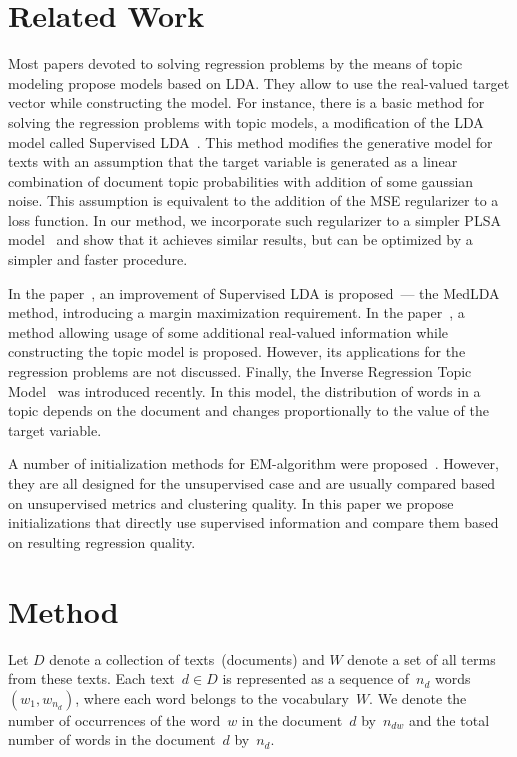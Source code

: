 \documentclass{sig-alternate-2013}
\begin{document}
\section{Related Work}
Most papers devoted to solving regression problems by the means of topic modeling
propose models based on LDA.
They allow to use the real-valued target vector while constructing the model.
For instance, there is a basic method for solving the regression problems
with topic models, a modification of the LDA model called Supervised LDA~\cite{blei07supervised}.
This method modifies the generative model for texts with an assumption
that the target variable is generated as a linear combination
of document topic probabilities with addition of some gaussian noise.
This assumption is equivalent to the addition of the MSE regularizer
to a loss function.
In our method, we incorporate such regularizer to a simpler PLSA model~\cite{hofmann99plsa}
and show that it achieves similar results, but can be optimized
by a simpler and faster procedure.

In the paper~\cite{zhu09medlda}, an improvement of Supervised LDA is proposed~--- the MedLDA method,
introducing a margin maximization requirement.
In the paper~\cite{mimno08arbitrary}, a method allowing usage of some additional
real-valued information while constructing the topic model is proposed.
However, its applications for the regression problems are not discussed.
Finally, the Inverse Regression Topic Model~\cite{rabinovich14irtm} was introduced recently.
In this model, the distribution of words in a topic depends on the document and changes
proportionally to the value of the target variable.

A number of initialization methods for EM-algorithm were proposed~\cite{meila98init, blomer13init}.
However, they are all designed for the unsupervised case and are usually compared
based on unsupervised metrics and clustering quality.
In this paper we propose initializations that directly use supervised information
and compare them based on resulting regression quality.


\section{Method}
Let $D$ denote a collection of texts~(documents) and $W$ denote a set of all terms from these texts.
Each text~$d \in D$ is represented as a sequence of~$n_d$ words $(w_1, w_{n_d})$,
where each word belongs to the vocabulary~$W$.
We denote the number of occurrences of the word~$w$ in the document~$d$ by~$n_{dw}$
and the total number of words in the document~$d$ by~$n_d$.
\end{document}
